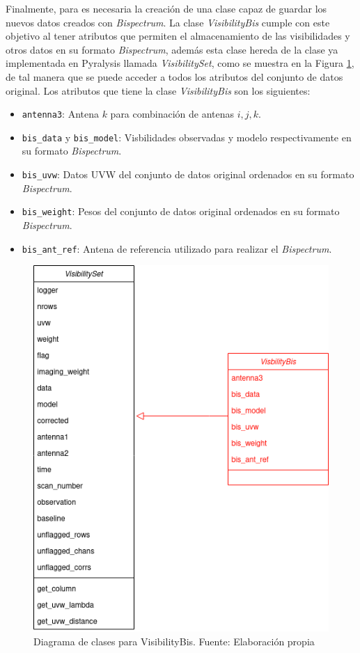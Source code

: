 Finalmente, para es necesaria la creación de una clase capaz de guardar los nuevos datos creados con \textit{Bispectrum}. La clase \textit{VisibilityBis} cumple con este objetivo al tener atributos que permiten el almacenamiento de las visibilidades y otros datos en su formato \textit{Bispectrum}, además esta clase hereda de la clase ya implementada en Pyralysis llamada \textit{VisibilitySet}, como se muestra en la Figura \ref{fig:visibilityBis_diagram}, de tal manera que se puede acceder a todos los atributos del conjunto de datos original. Los atributos que tiene la clase \textit{VisibilityBis} son los siguientes:

\begin{itemize}
    \item \texttt{antenna3}: Antena $k$ para combinación de antenas $i,j,k$.
    \item \texttt{bis\_data} y \texttt{bis\_model}: Visbilidades observadas y modelo respectivamente en su formato \textit{Bispectrum}.
    \item \texttt{bis\_uvw}: Datos UVW del conjunto de datos original ordenados en su formato \textit{Bispectrum}.
    \item \texttt{bis\_weight}: Pesos del conjunto de datos original ordenados en su formato \textit{Bispectrum}.
    \item \texttt{bis\_ant\_ref}: Antena de referencia utilizado para realizar el \textit{Bispectrum}.
\end{itemize}

\begin{figure}[!ht]
	\centering
	\captionsetup{justification=centering}
	\includegraphics[scale=0.4]{images/Pyralysis-Visibility_bis.png}
	\caption[Diagrama de clases para VisibilityBis]{Diagrama de clases para VisibilityBis. Fuente: Elaboración propia}
	\label{fig:visibilityBis_diagram}
\end{figure}
